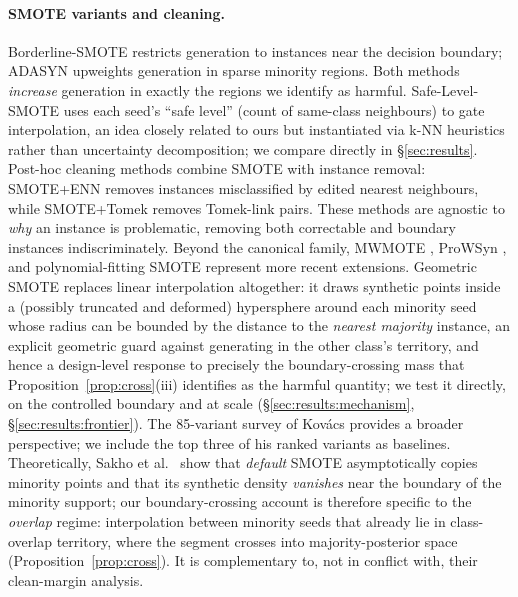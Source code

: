 \paragraph{SMOTE variants and cleaning.}
Borderline-SMOTE \cite{han2005borderline} restricts generation to instances
near the decision boundary; ADASYN \cite{he2008adasyn} upweights generation
in sparse minority regions. Both methods \emph{increase} generation in
exactly the regions we identify as harmful. Safe-Level-SMOTE
\cite{bunkhumpornpat2009safe} uses each seed's ``safe level'' (count of
same-class neighbours) to gate interpolation, an idea closely related to
ours but instantiated via k-NN heuristics rather than uncertainty
decomposition; we compare directly in \S\ref{sec:results}.
Post-hoc cleaning methods combine SMOTE with instance removal: SMOTE+ENN
\cite{batista2004study,wilson1972asymptotic} removes instances misclassified
by edited nearest neighbours, while SMOTE+Tomek
\cite{batista2004study,tomek1976two} removes Tomek-link pairs. These methods
are agnostic to \emph{why} an instance is problematic, removing both
correctable and boundary instances indiscriminately. Beyond the canonical
family, MWMOTE \cite{barua2014mwmote}, ProWSyn \cite{barua2011prowsyn}, and
polynomial-fitting SMOTE \cite{gazzah2008new} represent more recent
extensions. Geometric SMOTE \cite{douzas2019geometric} replaces linear
interpolation altogether: it draws synthetic points inside a (possibly
truncated and deformed) hypersphere around each minority seed whose radius can
be bounded by the distance to the \emph{nearest majority} instance, an explicit
geometric guard against generating in the other class's territory, and hence a
design-level response to precisely the boundary-crossing mass that
Proposition~\ref{prop:cross}(iii) identifies as the harmful quantity; we test
it directly, on the controlled boundary and at scale
(\S\ref{sec:results:mechanism}, \S\ref{sec:results:frontier}). The
85-variant survey of Kov\'acs \cite{kovacs2019smote}
provides a broader perspective; we include the top three of his ranked
variants as baselines. Theoretically, Sakho et al.\ \cite{sakho2024rebalancing}
show that \emph{default} SMOTE asymptotically copies minority points and that its
synthetic density \emph{vanishes} near the boundary of the minority support; our
boundary-crossing account is therefore specific to the \emph{overlap} regime:
interpolation between minority seeds that already lie in class-overlap territory,
where the segment crosses into majority-posterior space
(Proposition~\ref{prop:cross}). It is complementary to, not in conflict with, their
clean-margin analysis.

